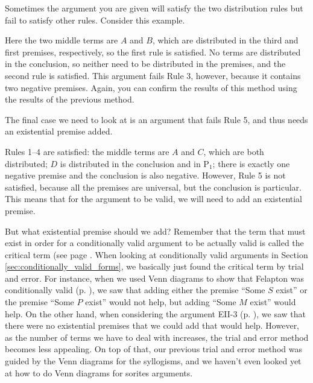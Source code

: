 Sometimes the argument you are given will satisfy the two distribution rules but fail to satisfy other rules. Consider this example.

\begin{kormanize}
 \end{kormanize}

Here the two middle terms are $A$ and $B$, which are distributed in the third and first premises, respectively, so the first rule is satisfied. No terms are distributed in the conclusion, so neither need to be distributed in the premises, and the second rule is satisfied. This argument fails Rule 3, however, because it contains two negative premises. Again, you can confirm the results of this method using the results of the previous method.

The final case we need to look at is an argument that fails Rule 5, and thus needs an existential premise added.

\begin{kormanize}
\end{kormanize}

Rules 1--4 are satisfied: the middle terms are $A$ and $C$, which are both distributed; $D$ is distributed in the conclusion and in P$_1$; there is exactly one negative premise and the conclusion is also negative. However, Rule 5 is not satisfied, because all the premises are universal, but the conclusion is particular. This means that for the argument to be valid, we will need to add an existential premise.

But what existential premise should we add? Remember that the term that must exist in order for a conditionally valid argument to be actually valid is called the critical term (see page \pageref{def:critical_term}. When looking at conditionally valid arguments in Section \ref{sec:conditionally_valid_forms}, we basically just found the critical term by trial and error. For instance, when we used Venn diagrams to show that Felapton was conditionally valid (p. \pageref{CVFex2}), we saw that adding either the premise ``Some $S$ exist'' or the premise ``Some $P$ exist'' would not help, but adding ``Some $M$ exist'' would help. On the other hand, when considering the argument EII-3 (p. \pageref{CVFex3}), we saw that there were no existential premises that we could add that would help. However, as the number of terms we have to deal with increases, the trial and error method becomes less appealing. On top of that, our previous trial and error method was guided by the Venn diagrams for the syllogisms, and we haven't even looked yet at how to do Venn diagrams for sorites arguments.


